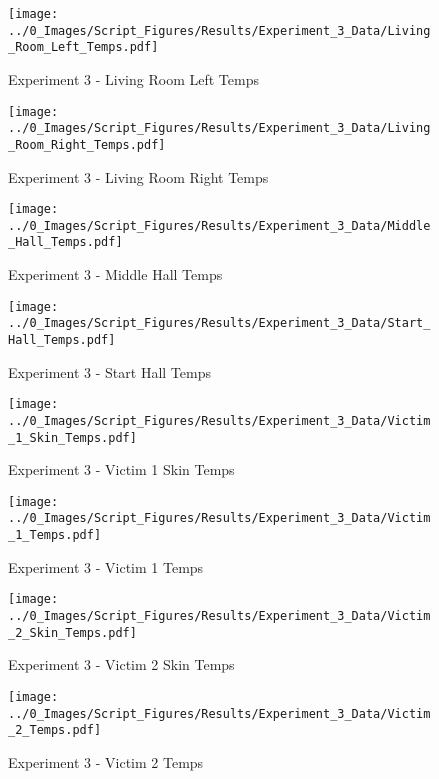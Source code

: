 	\begin{figure}[H]
		\centering
		\texttt{[image: ../0\_Images/Script\_Figures/Results/Experiment\_3\_Data/Living\_Room\_Left\_Temps.pdf]}
		\caption[]{Experiment 3 - Living Room Left Temps}
	\end{figure}
 
	\clearpage

	\begin{figure}[H]
		\centering
		\texttt{[image: ../0\_Images/Script\_Figures/Results/Experiment\_3\_Data/Living\_Room\_Right\_Temps.pdf]}
		\caption[]{Experiment 3 - Living Room Right Temps}
	\end{figure}
 

	\begin{figure}[H]
		\centering
		\texttt{[image: ../0\_Images/Script\_Figures/Results/Experiment\_3\_Data/Middle\_Hall\_Temps.pdf]}
		\caption[]{Experiment 3 - Middle Hall Temps}
	\end{figure}
 
	\clearpage

	\begin{figure}[H]
		\centering
		\texttt{[image: ../0\_Images/Script\_Figures/Results/Experiment\_3\_Data/Start\_Hall\_Temps.pdf]}
		\caption[]{Experiment 3 - Start Hall Temps}
	\end{figure}
 

	\begin{figure}[H]
		\centering
		\texttt{[image: ../0\_Images/Script\_Figures/Results/Experiment\_3\_Data/Victim\_1\_Skin\_Temps.pdf]}
		\caption[]{Experiment 3 - Victim 1 Skin Temps}
	\end{figure}
 
	\clearpage

	\begin{figure}[H]
		\centering
		\texttt{[image: ../0\_Images/Script\_Figures/Results/Experiment\_3\_Data/Victim\_1\_Temps.pdf]}
		\caption[]{Experiment 3 - Victim 1 Temps}
	\end{figure}
 

	\begin{figure}[H]
		\centering
		\texttt{[image: ../0\_Images/Script\_Figures/Results/Experiment\_3\_Data/Victim\_2\_Skin\_Temps.pdf]}
		\caption[]{Experiment 3 - Victim 2 Skin Temps}
	\end{figure}
 
	\clearpage

	\begin{figure}[H]
		\centering
		\texttt{[image: ../0\_Images/Script\_Figures/Results/Experiment\_3\_Data/Victim\_2\_Temps.pdf]}
		\caption[]{Experiment 3 - Victim 2 Temps}
	\end{figure}
 

